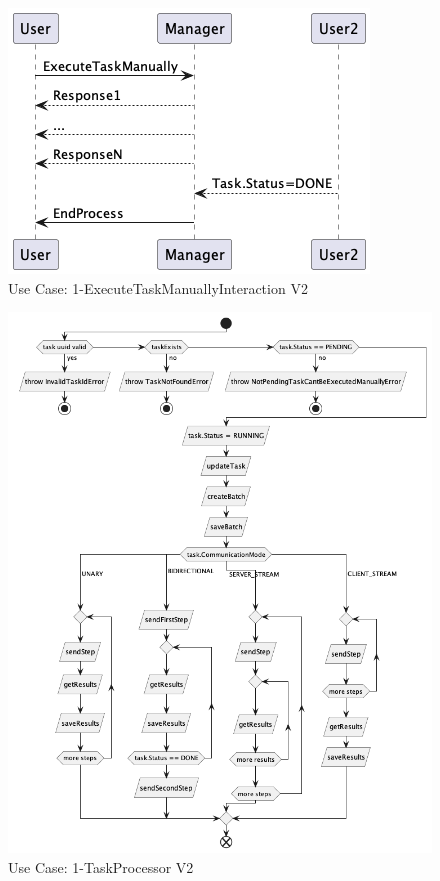 \begin{figure}[H]
    \centering
    \includegraphics[height=0.3\textheight]{./part/Ejecucion/Seguimiento/MemoriaExplicativaDeCambios/img/1-ExecuteTaskManuallyInteraction}
    \caption{Use Case: 1-ExecuteTaskManuallyInteraction V2}\label{fig:1-ExecuteTaskManuallyInteractionV2}
\end{figure}

\begin{figure}[H]
    \centering
    \includegraphics[height=0.55\textheight]{./part/Ejecucion/Seguimiento/MemoriaExplicativaDeCambios/img/1-TaskProcessor}
    \caption{Use Case: 1-TaskProcessor V2}\label{fig:1-TaskProcessorV2}
\end{figure}

